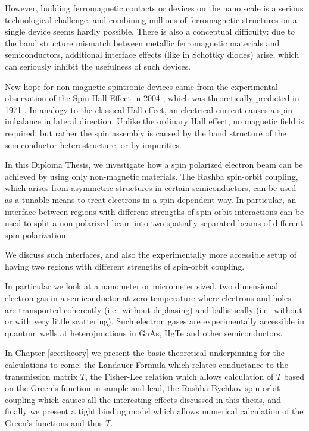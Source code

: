 However, building ferromagnetic contacts or devices on
the nano scale is a serious technological challenge, and combining millions of
ferromagnetic structures on a single device seems hardly possible. There is
also a conceptual difficulty: due to the band structure mismatch between
metallic ferromagnetic materials and semiconductors, additional interface
effects (like in Schottky diodes) arise, which can seriously inhibit the
usefulness of such devices.

New hope for non-magnetic spintronic devices came from the experimental
observation of the Spin-Hall Effect in 2004 \cite{SHE}, which was
theoretically predicted in 1971 \cite{dyakonov}. In analogy to the
classical Hall effect, an electrical current causes a spin imbalance in
lateral direction. Unlike the ordinary Hall effect, no magnetic field is
required, but rather the spin assembly is caused by the band
structure of the semiconductor heterostructure, or by impurities.

In this Diploma Thesis, we investigate how a spin polarized electron
beam can be achieved by using only non-magnetic materials. The Rashba 
spin-orbit coupling, which arises from
asymmetric structures in certain semiconductors, can be used as a tunable
means to treat
electrons in a spin-dependent way. In particular, an interface
between regions with different strengths of spin orbit interactions can be
used to split a non-polarized beam into two spatially separated beams of
different spin polarization.

We discuss such interfaces, and also the experimentally more accessible setup
of having two regions with different strengths of spin-orbit coupling.

In particular we look at a nanometer or micrometer sized, two dimensional
electron gas in a semiconductor at zero temperature where electrons and holes
are transported coherently (i.e.~without dephasing) and ballistically
(i.e.~without or with very little scattering). Such electron gases are
experimentally accessible in quantum wells at heterojunctions in GaAs,
HgTe and other semiconductors.

In Chapter \ref{sec:theory} we present the basic theoretical underpinning for
the calculations to come: the Landauer Formula which relates conductance to
the transmission matrix $T$, the Fisher-Lee relation which allows calculation
of $T$ based on the Green's function in sample and lead, the Rashba-Bychkov
spin-orbit coupling which causes all the interesting effects discussed in this
thesis, and finally we present a tight binding model which allows numerical
calculation of the Green's functions and thus $T$.

